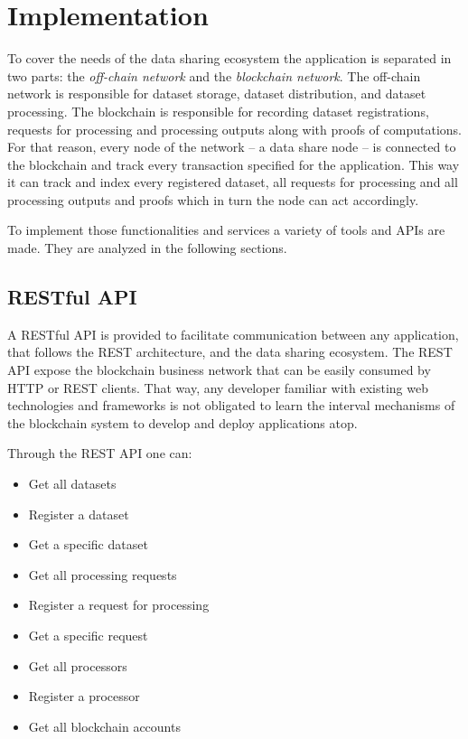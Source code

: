 \chapter{Implementation}
\label{implemenation}

To cover the needs of the data sharing ecosystem the application is separated in two parts: the \textit{off-chain network} and the \textit{blockchain network}. The off-chain network is responsible for dataset storage, dataset distribution, and dataset processing. The blockchain is responsible for recording dataset registrations, requests for processing and processing outputs along with proofs of computations. For that reason, every node of the network -- a data share node -- is connected to the blockchain and track every transaction specified for the application. This way it can track and index every registered dataset, all requests for processing and all processing outputs and proofs which in turn the node can act accordingly.

To implement those functionalities and services a variety of tools and APIs are made. They are analyzed in the following sections.

\section{RESTful API}
\label{implemenation:rest}

A RESTful API is provided to facilitate communication between any application, that follows the REST architecture, and the data sharing ecosystem. The REST API expose the blockchain business network that can be easily consumed by HTTP or REST clients. That way, any developer familiar with existing web technologies and frameworks is not obligated to learn the interval mechanisms of the blockchain system to develop and deploy applications atop.

Through the REST API one can:

\begin{itemize}
  \item Get all datasets
  \item Register a dataset
  \item Get a specific dataset
  \item Get all processing requests
  \item Register a request for processing
  \item Get a specific request
  \item Get all processors
  \item Register a processor
  \item Get all blockchain accounts
\end{itemize}

